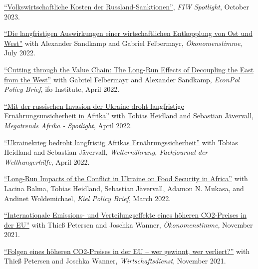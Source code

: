 \documentclass{article}
\begin{document}
\begin{minipage}[t]{0.8\textwidth}
    \href{https://www.fiw.ac.at/2023/10/02/volkswirtschaftliche-kosten-der-russland-sanktionen/}{``Volkswirtschaftliche Kosten der Russland-Sanktionen''}, \textit{FIW Spotlight}, October 2023. \par
    \href{https://www.oekonomenstimme.org/artikel/2022/07/die-langfristigen-auswirkungen-einer-wirtschaftlichen-entkopplung-von-ost-und-west/}{``Die langfristigen Auswirkungen einer wirtschaftlichen Entkopplung von Ost und West''} with Alexander Sandkamp and Gabriel Felbermayr, \textit{Ökonomenstimme}, July 2022. \par
    \href{https://www.cesifo.org/en/publikationen/2022/working-paper/cutting-through-value-chain-long-run-effects-decoupling-east-west}{``Cutting through the Value Chain: The Long-Run Effects of Decoupling the East from the West''} with Gabriel Felbermayr and Alexander Sandkamp, \textit{EconPol Policy Brief}, ifo Institute, April 2022. \par
    \href{https://www.megatrends-afrika.de/publikation/mit-der-russischen-invasion-der-ukraine-droht-langfristige-ernaehrungsunsicherheit-in-afrika}{``Mit der russischen Invasion der Ukraine droht langfristige Ernährungsunsicherheit in Afrika''} with Tobias Heidland and Sebastian Jävervall, \textit{Megatrends Afrika - Spotlight}, April 2022. \par
    \href{https://www.welthungerhilfe.de/welternaehrung/rubriken/agrar-ernaehrungspolitik/wie-der-ukrainekrieg-afrikas-brotversorgung-trifft/}{``Ukrainekrieg bedroht langfristig Afrikas Ernährungssicherheit''} with Tobias Heidland and Sebastian Jävervall, \textit{Welternährung, Fachjournal der Welthungerhilfe}, April 2022. \par
    \href{https://www.ifw-kiel.de/publications/kiel-policy-brief/ukraine-special/long-run-impacts-of-the-conflict-in-ukraine-on-food-security-in-africa-17165/}{``Long-Run Impacts of the Conflict in Ukraine on Food Security in Africa''} with Lacina Balma, Tobias Heidland, Sebastian Jävervall, Adamon N. Mukasa, and Andinet Woldemichael, \textit{Kiel Policy Brief}, March 2022. \par
    \href{https://www.oekonomenstimme.org/artikel/2021/11/internationale-emissions--und-verteilungseffekte-eines-hoeheren-co2-preises-in-der-eu/}{``Internationale Emissions- und Verteilungseffekte eines höheren CO2-Preises in der EU''} with Thieß Petersen and Joschka Wanner, \textit{Ökonomenstimme}, November 2021. \par
\href{https://www.wirtschaftsdienst.eu/inhalt/jahr/2021/heft/11/beitrag/folgen-eines-hoeheren-co2-preises-in-der-eu-wer-gewinnt-wer-verliert.html}{``Folgen eines höheren CO2-Preises in der EU – wer gewinnt, wer verliert?''} with Thieß Petersen and Joschka Wanner, \textit{Wirtschaftsdienst}, November 2021. \par

\end{minipage}
\end{document}
